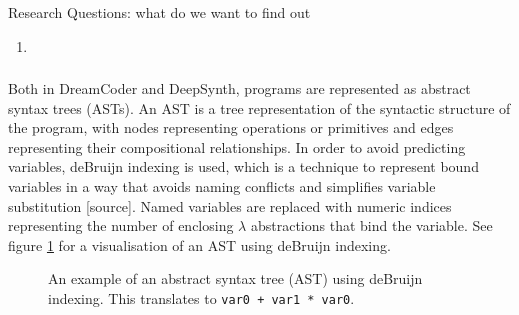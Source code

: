 Research Questions: what do we want to find out
\begin{enumerate}
    \item 
\end{enumerate} 



\subsubsection{}

Both in DreamCoder and DeepSynth, programs are represented as abstract syntax trees (ASTs). An AST is a tree representation of the syntactic structure of the program, with nodes representing operations or primitives and edges representing their compositional relationships. In order to avoid predicting variables, deBruijn indexing is used, which is a technique to represent bound variables in a way that avoids naming conflicts and simplifies variable substitution [source]. Named variables are replaced with numeric indices representing the number of enclosing $\lambda$ abstractions that bind the variable. See figure \ref{fig:AST} for a visualisation of an AST using deBruijn indexing.

\begin{figure}[H]
    \centering
    \caption{An example of an abstract syntax tree (AST) using deBruijn indexing. This translates to \texttt{var0 + var1 * var0}.}
    \label{fig:AST}
\end{figure}

